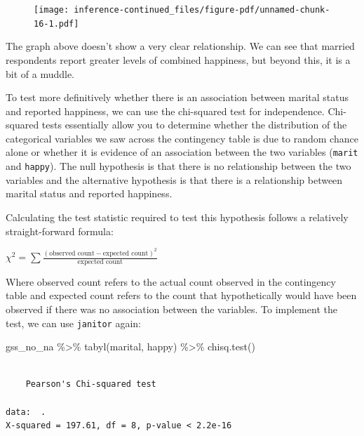 \documentclass[
  letterpaper,
]{book}
\newenvironment{Shaded}{\begin{snugshade}}{\end{snugshade}}
\newcommand{\FunctionTok}[1]{\textcolor[rgb]{0.28,0.35,0.67}{#1}}
\newcommand{\NormalTok}[1]{\textcolor[rgb]{0.00,0.23,0.31}{#1}}
\newcommand{\SpecialCharTok}[1]{\textcolor[rgb]{0.37,0.37,0.37}{#1}}
\begin{document}
\begin{figure}[H]

{\centering \texttt{[image: inference-continued\_files/figure-pdf/unnamed-chunk-16-1.pdf]}

}

\end{figure}

The graph above doesn't show a very clear relationship. We can see that
married respondents report greater levels of combined happiness, but
beyond this, it is a bit of a muddle.

To test more definitively whether there is an association between
marital status and reported happiness, we can use the chi-squared test
for independence. Chi-squared tests essentially allow you to determine
whether the distribution of the categorical variables we saw across the
contingency table is due to random chance alone or whether it is
evidence of an association between the two variables (\texttt{marit} and
\texttt{happy}). The null hypothesis is that there is no relationship
between the two variables and the alternative hypothesis is that there
is a relationship between marital status and reported happiness.

Calculating the test statistic required to test this hypothesis follows
a relatively straight-forward formula:

\(\chi^2 = \sum \frac{(\text{observed count} - \text{expected count})^2}{\text{expected count}}\)

Where observed count refers to the actual count observed in the
contingency table and expected count refers to the count that
hypothetically would have been observed if there was no association
between the variables. To implement the test, we can use
\texttt{janitor} again:

\begin{Shaded}
\begin{Highlighting}[]
\NormalTok{gss\_no\_na }\SpecialCharTok{\%\textgreater{}\%}
  \FunctionTok{tabyl}\NormalTok{(marital, happy) }\SpecialCharTok{\%\textgreater{}\%}
  \FunctionTok{chisq.test}\NormalTok{()}
\end{Highlighting}
\end{Shaded}

\begin{verbatim}

    Pearson's Chi-squared test

data:  .
X-squared = 197.61, df = 8, p-value < 2.2e-16
\end{verbatim}
\end{document}
